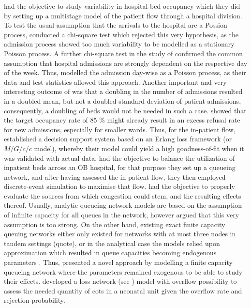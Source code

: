 \documentclass[11pt,a4paper]{article}
\begin{document}
\begin{spacing}{1.8}
\citet{Harrison2005} had the objective to study variability in hospital bed occupancy which they did by setting up a multistage model of the patient flow through a hospital division. To test the usual assumption that the arrivals to the hospital are a Possion process, \citet{Harrison2005} conducted a chi-square test which rejected this very hypothesis, as the  admission process showed too much variability to be modelled as a stationary Poisson process. A further chi-square test in the study of \citep{Harrison2005} confirmed the common assumption that hospital admissions are strongly dependent on the respective day of the week. Thus, \citet{Harrison2005} modelled the admission day-wise as a Poisson process, as their data and test-statistics allowed this approach. Another important and very interesting outcome of  \citep{Harrison2005} was that a doubling in the number of admissions  resulted in a doubled  mean, but not a doubled standard deviation of patient admissions, consequently, a doubling of beds would not be needed in such a case.
 \citet{Bruin2009} showed that the target occupancy rate of 85 \% might already result in an excess refusal rate for new admissions, especially for smaller wards. Thus,  for the in-patient flow,  \citet{Bruin2009}
 established a decision support system based on an Erlang loss framework (or \(M/G/c/c\) model), whereby their model could yield a high goodness-of-fit when it was validated with actual data. 
 \citet{Cochran2006} had the objective to balance the utilization of inpatient beds across an OB hospital, for that purpose they set up a queueing network, and after having assessed the in-patient flow, they then employed discrete-event simulation to maximise that flow. 
\citet{Osorio2009} had the objective to properly evaluate the sources from which congestion could stem, and the resulting effects thereof. Usually, analytic queueing network models are based on the assumption of infinite capacity for all queues in the network, however \citet{Osorio2009} argued that this very assumption is too strong. On the other hand, existing exact finite capacity queuing networks either only existed for networks with at most three nodes in tandem settings (quote), or in the analytical case the models relied upon approximation which resulted in queue capacities becoming endogenous parameters . Thus, \citet{Osorio2009} presented a novel approach by modelling a finite capacity queueing network where the parameters remained exogenous to be able to study their effects. 
\citet{Asaduzzaman2009} developed a loss network (see \citep{Kelly1991}) model with overflow possibility to assess the needed quantity of cots in a neonatal unit given the overflow rate and rejection probability. 

\end{spacing}
\end{document}
